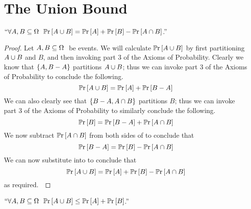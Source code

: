     \section{The Union Bound}
        \begin{theorem}
            $``\forall \subs{A, B}{\Omega} \ \pr{\union{A}{B}} = \pr{A} + \pr{B} - \pr{\intersect{A}{B}}$.''
            \label{Pr union Theorem}
        \end{theorem}
        \begin{proof}
            Let $A, B \subseteq \Omega \ $ be events. We will calculate $\mathbb{P}\mathrm{r} \left[A \cup B\right]$
            by first partitioning $A \cup B$ and $B$, and then invoking part 3 of the Axioms
            of Probability. Clearly we know that $\left\{A, B - A\right\}$ partitions $A \cup B$;
            thus we can invoke part 3 of the Axioms of Probability to conclude the following.
            \begin{equation}
                \mathbb{P}\mathrm{r} \left[A \cup B\right] = \mathbb{P}\mathrm{r} \left[A\right] + \mathbb{P}\mathrm{r} \left[B - A\right]
                \label{Pr union equation 1}
            \end{equation}
            We can also clearly see that $\left\{B - A, A \cap B\right\}$ partitions $B$;
            thus we can invoke part 3 of the Axioms of Probability to similarly conclude the following.
            \begin{equation}
                \mathbb{P}\mathrm{r} \left[B\right] = \mathbb{P}\mathrm{r} \left[B - A\right] + \mathbb{P}\mathrm{r} \left[A \cap B\right]
                \label{Pr union equation 2}
            \end{equation}
            We now subtract $\mathbb{P}\mathrm{r} \left[A \cap B\right]$ from both sides of 
            to conclude that
            \begin{equation}
                \mathbb{P}\mathrm{r} \left[B - A\right] = \mathbb{P}\mathrm{r} \left[B\right] -  \mathbb{P}\mathrm{r} \left[A \cap B\right]
                \label{Pr union equation 3}
            \end{equation}
            We can now substitute  into 
            to conclude that
            \[
                \mathbb{P}\mathrm{r} \left[A \cup B\right] = \mathbb{P}\mathrm{r} \left[A\right] + \mathbb{P}\mathrm{r} \left[B\right] - \mathbb{P}\mathrm{r} \left[A \cap B\right]
            \]
            as required.~\QED
        \end{proof}
        \begin{corollary}
            $``\forall \subs{A, B}{\Omega} \ \pr{\union{A}{B}} \le \pr{A} + \pr{B}$.''
            \label{Union Bound n = 2}
        \end{corollary}
